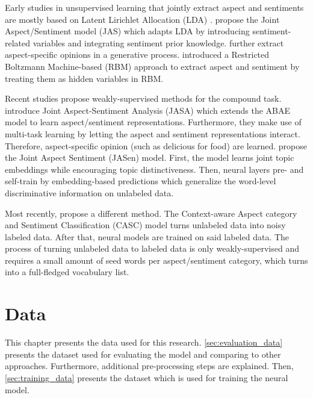 \documentclass[american, oneside]{ecsgdp}
\begin{document}
Early studies in unsupervised learning that jointly extract aspect and sentiments are mostly based on Latent Lirichlet Allocation (LDA) \parencite{Blei2003LDA}. \textcite{Xu2012JAS} propose the Joint Aspect/Sentiment model (JAS) which adapts LDA by introducing sentiment-related variables and integrating sentiment prior knowledge. \textcite{Zhao2010MaxEnt-LDA} further extract aspect-specific opinions in a generative process. \textcite{Wang2015Boltzmann} introduced a Restricted Boltzmann Machine-based (RBM) approach to extract aspect and sentiment by treating them as hidden variables in RBM.

Recent studies propose weakly-supervised methods for the compound task.
\textcite{Zhuang2020JASA} introduce Joint Aspect-Sentiment Analysis (JASA) which extends the ABAE model to learn aspect/sentiment representations. Furthermore, they make use of multi-task learning by letting the aspect and sentiment representations interact. Therefore, aspect-specific opinion (such as delicious for food) are learned. \textcite{Huang2020JASen} propose the Joint Aspect Sentiment (JASen) model. First, the model learns joint topic embeddings while encouraging topic distinctiveness. Then, neural layers pre- and self-train by embedding-based predictions which generalize the word-level discriminative information on unlabeled data. 

Most recently, \textcite{Kumar2021CASC} propose a different method. The Context-aware Aspect category and Sentiment Classification (CASC) model turns unlabeled data into noisy labeled data. After that, neural models are trained on said labeled data. The process of turning unlabeled data to labeled data is only weakly-supervised and requires a small amount of seed words per aspect/sentiment category, which turns into a full-fledged vocabulary list. 

\chapter{Data} \label{chap:data}
This chapter presents the data used for this research. \cref{sec:evaluation_data} presents the dataset used for evaluating the model and comparing to other approaches. Furthermore, additional pre-processing steps are explained. Then, \cref{sec:training_data} presents the dataset which is used for training the neural model.
\end{document}
